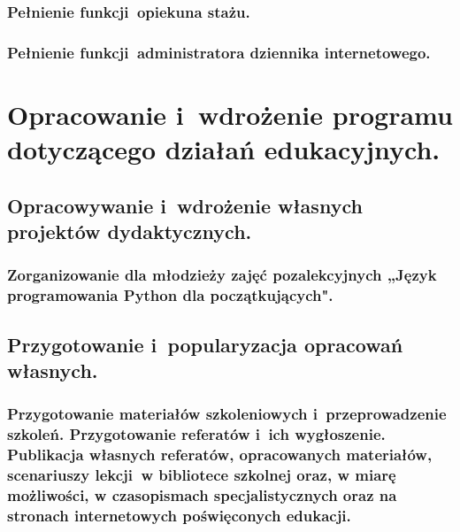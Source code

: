 \documentclass[a4paper,titlepage,13pt,draft]{mwart}
\begin{document}
\begin{flushleft}
\subsubsection{Pełnienie funkcji~opiekuna stażu.}\label{opiekun}
\subsubsection{Pełnienie funkcji~administratora dziennika internetowego.}
\section{Opracowanie i~wdrożenie programu dotyczącego działań edukacyjnych.}
\subsection{Opracowywanie i~wdrożenie własnych projektów dydaktycznych.} \label{dzeduk}
\subsubsection{Zorganizowanie dla młodzieży zajęć pozalekcyjnych „Język programowania Python dla początkujących".}\label{kursPython}
\subsection{Przygotowanie i~popularyzacja opracowań własnych.}
\subsubsection{Przygotowanie materiałów szkoleniowych i~przeprowadzenie szkoleń. Przygotowanie referatów i~ich wygłoszenie. Publikacja własnych referatów, opracowanych materiałów, scenariuszy lekcji~w bibliotece szkolnej oraz, w miarę możliwości, w czasopismach specjalistycznych oraz na stronach internetowych poświęconych edukacji.}
\newpage

\end{flushleft}
\end{document}
